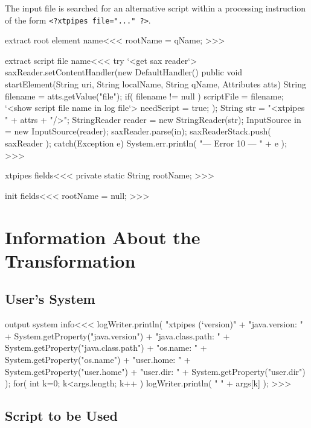 \documentclass{article}
\begin{document}
The input file is
searched for an alternative script within a processing instruction of
the form \verb+<?xtpipes file="..." ?>+.


\<extract root element name\><<<
rootName = qName;
>>>


\<extract script file name\><<<
try {
   `<get sax reader`>      
   saxReader.setContentHandler(new DefaultHandler() { 
      public void startElement(String uri, String localName, 
         String qName, Attributes atts) { 
         String filename = atts.getValue("file");
         if( filename != null ){
            scriptFile = filename;
            `<show script file name in log file`>
            needScript = true;
      }  }
   }); 
   String str = "<xtpipes " + attrs + "/>"; 
   StringReader reader = new StringReader(str); 
   InputSource in = new InputSource(reader); 
   saxReader.parse(in); 
   saxReaderStack.push( saxReader );
} catch(Exception e){ 
   System.err.println( "--- Error 10 --- " + e ); 
} 
>>>







\<xtpipes fields\><<<
private static String  rootName;
>>>


\<init fields\><<<
rootName = null;
>>>




\section{Information About the Transformation}

\subsection{User's System}



\<output system info\><<<
logWriter.println(
     "xtpipes (`version)"
     + "\n java.version: "    + System.getProperty("java.version")  
     + "\n java.class.path: " + System.getProperty("java.class.path")  
     + "\n os.name: "         + System.getProperty("os.name")  
     + "\n user.home: "       + System.getProperty("user.home")  
     + "\n user.dir: "        + System.getProperty("user.dir") 
);
for( int k=0; k<args.length; k++ ){
  logWriter.println( "     " + args[k] );
}
>>>
    
\subsection{Script to be Used}
\end{document}

